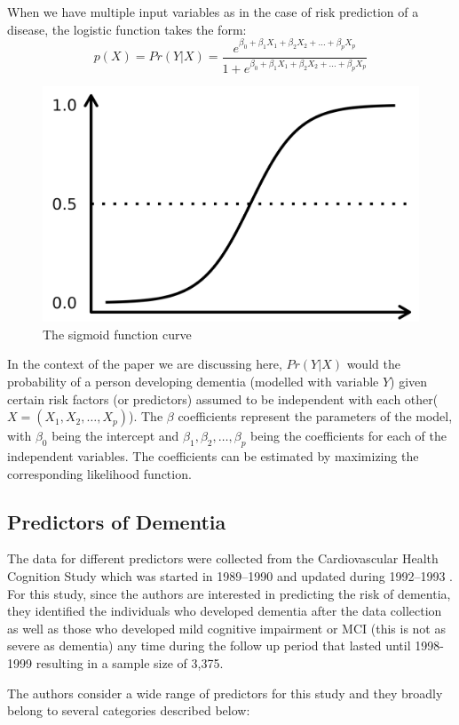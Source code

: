 \documentclass[12pt,letterpaper]{article}
\begin{document}
When we have multiple input variables as in the case of risk prediction of a disease, the logistic function takes the form:
\begin{equation}
p(X) =Pr (Y|X)= \frac{e^{\beta_0+\beta_1X_1+\beta_2X_2+...+\beta_pX_p}}{1+e^{\beta_0+\beta_1X_1+\beta_2X_2+...+\beta_pX_p}}
\end{equation}

\begin{figure}
\vspace{-4 mm}
\includegraphics[width=7 cm]{sigmoid.png}
\caption{The sigmoid function curve\cite{sigmoid}}
\label{dvdr}
\end{figure}
In the context of the paper we are discussing here, $Pr (Y|X)$ would the probability of a person developing dementia (modelled with variable $Y$) given certain risk factors (or predictors) assumed to be independent with each other($X=(X_1,X_2,\dots,X_p)$). The $\beta$ coefficients represent the parameters of the model, with $\beta_0$ being the intercept and $\beta_1,\beta_2,\dots,\beta_p$ being the coefficients for each of the independent variables. The coefficients can be estimated by maximizing the corresponding likelihood function.  

\subsection{Predictors of Dementia}

The data for different predictors were collected from the Cardiovascular Health Cognition Study which was started in 1989–1990 and updated during 1992–1993 \cite{Kuller2003,Lopez2003}. For this study, since the authors are interested in predicting the risk of dementia, they identified the individuals who developed dementia after the data collection as well as those who developed mild cognitive impairment or MCI (this is not as severe as dementia) any time during the follow up period that lasted until 1998-1999 resulting in a sample size of 3,375. 

The authors consider a wide range of predictors for this study and they broadly belong to several categories described below:
\end{document}
